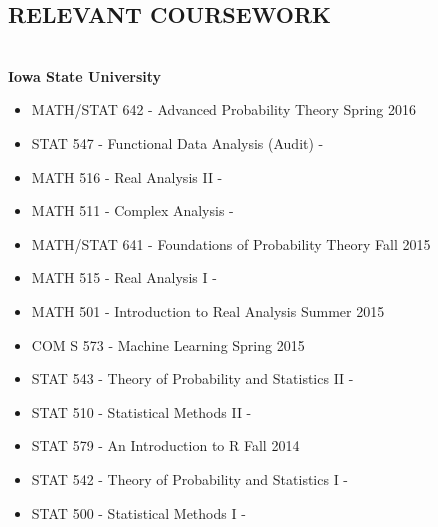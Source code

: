 \documentclass{res} %
\begin{document}
\begin{resume}
\section{RELEVANT COURSEWORK}

\hrulefill \\
{\bf Iowa State University }
\begin{itemize}\itemsep -2pt 
\item MATH/STAT 642 - Advanced Probability Theory \dotfill Spring 2016 
\item STAT 547 - Functional Data Analysis (Audit) \hfill -
\item MATH 516 - Real Analysis II \hfill - 
\item MATH 511 - Complex Analysis \hfill -
\item MATH/STAT 641 - Foundations of Probability Theory \dotfill Fall 2015
\item MATH 515 - Real Analysis I \hfill -
\item MATH 501 - Introduction to Real Analysis \dotfill Summer 2015 
\item COM S 573 - Machine Learning \dotfill Spring 2015
\item STAT 543 - Theory of Probability and Statistics II \hfill -
\item STAT 510 - Statistical Methods II \hfill -
\item STAT 579 - An Introduction to R \dotfill Fall 2014
\item STAT 542 - Theory of Probability and Statistics I \hfill -
\item STAT 500 - Statistical Methods I \hfill -
\end{itemize}



\end{resume} 
\end{document}
